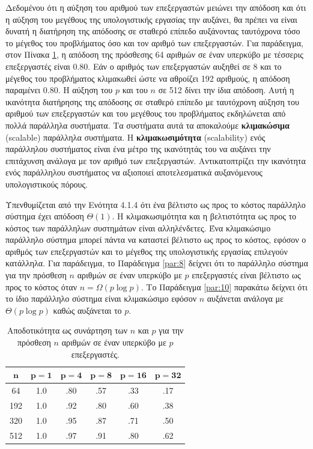 \documentclass[12pt,a4paper]{article}
\begin{document}
Δεδομένου ότι η αύξηση του αριθμού των επεξεργαστών μειώνει την απόδοση 
και ότι η αύξηση του μεγέθους της υπολογιστικής εργασίας την αυξάνει, θα 
πρέπει να είναι δυνατή η διατήρηση της απόδοσης σε σταθερό επίπεδο 
αυξάνοντας ταυτόχρονα τόσο το μέγεθος του προβλήματος όσο και τον αριθμό 
των επεξεργαστών. Για παράδειγμα, στον Πίνακα \ref{tab:table41}, η 
απόδοση της πρόσθεσης 64 αριθμών σε έναν υπερκύβο με τέσσερις
επεξεργαστές είναι 0.80. Εάν ο αριθμός των επεξεργαστών αυξηθεί σε 8 και 
το μέγεθος του προβλήματος κλιμακωθεί ώστε να αθροίζει 192 αριθμούς, η 
απόδοση παραμένει 0.80. Η αύξηση του $p$ και του $n$ σε 512 δίνει την 
ίδια απόδοση. Αυτή η ικανότητα διατήρησης της απόδοσης σε σταθερό επίπεδο 
με ταυτόχρονη αύξηση του αριθμού των επεξεργαστών και του μεγέθους του 
προβλήματος εκδηλώνεται από πολλά παράλληλα συστήματα. Τα συστήματα αυτά 
τα αποκαλούμε \textbf{κλιμακώσιμα} (\foreignlanguage{english}{scalable}) 
παράλληλα συστήματα. Η \textbf{κλιμακωσιμότητα} (\foreignlanguage{english}{scalability})
ενός παράλληλου συστήματος είναι ένα μέτρο της ικανότητάς του να αυξάνει 
την επιτάχυνση ανάλογα με τον αριθμό των επεξεργαστών. Αντικατοπτρίζει 
την ικανότητα ενός παράλληλου συστήματος να αξιοποιεί αποτελεσματικά 
αυξανόμενους υπολογιστικούς πόρους.

Υπενθυμίζεται από την Ενότητα 4.1.4 ότι ένα βέλτιστο ως προς το κόστος 
παράλληλο σύστημα έχει απόδοση $\Theta(1)$. Η κλιμακωσιμότητα και η 
βελτιστότητα ως προς το κόστος των παράλληλων συστημάτων είναι αλληλένδετες. 
Ένα κλιμακώσιμο παράλληλο σύστημα μπορεί πάντα να καταστεί βέλτιστο ως 
προς το κόστος, εφόσον ο αριθμός των επεξεργαστών και το μέγεθος της
υπολογιστικής εργασίας επιλεγούν κατάλληλα. Για παράδειγμα, το Παράδειγμα 
\ref{par:8} δείχνει ότι το παράλληλο σύστημα για την πρόσθεση $n$ αριθμών 
σε έναν υπερκύβο με $p$ επεξεργαστές είναι βέλτιστο ως προς το κόστος 
όταν $n = \Omega(p \log p)$. Το Παράδειγμα \ref{par:10} παρακάτω δείχνει 
ότι το ίδιο παράλληλο σύστημα είναι κλιμακώσιμο εφόσον $n$ αυξάνεται ανάλογα 
με $\Theta(p \log p)$ καθώς αυξάνεται το $p$.

\begin{table}[H]
\centering
\caption{Αποδοτικότητα ως συνάρτηση των $n$ και $p$ για την πρόσθεση $n$ 
αριθμών σε έναν υπερκύβο με $p$ επεξεργαστές.}
\label{tab:table41}
\vspace{0.2cm} %

\begin{tabular}{cccccc}
\toprule
$\mathbf{n}$ & $\mathbf{p = 1}$ & $\mathbf{p = 4}$ & $\mathbf{p = 8}$ & $\mathbf{p = 16}$ & $\mathbf{p = 32}$ \\
\midrule
64  & 1.0 & .80 & .57 & .33 & .17 \\
192 & 1.0 & .92 & .80 & .60 & .38 \\
320 & 1.0 & .95 & .87 & .71 & .50 \\
512 & 1.0 & .97 & .91 & .80 & .62 \\
\bottomrule
\end{tabular}
\end{table}
\end{document}
